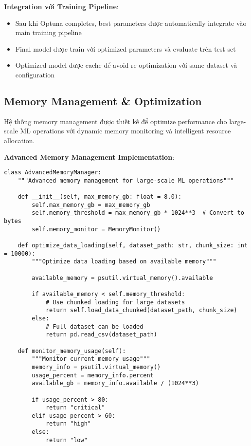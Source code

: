 \textbf{Integration với Training Pipeline}:
\begin{itemize}[leftmargin=*]
    \item Sau khi Optuna completes, best parameters được automatically integrate vào main training pipeline
    \item Final model được train với optimized parameters và evaluate trên test set
    \item Optimized model được cache để avoid re-optimization với same dataset và configuration
\end{itemize}

\subsection{Memory Management \& Optimization}\label{subsec:memory-management}

\noindent
Hệ thống memory management được thiết kế để optimize performance cho large-scale ML operations với dynamic memory monitoring và intelligent resource allocation.

\textbf{Advanced Memory Management Implementation}:

\begin{verbatim}
class AdvancedMemoryManager:
    """Advanced memory management for large-scale ML operations"""
    
    def __init__(self, max_memory_gb: float = 8.0):
        self.max_memory_gb = max_memory_gb
        self.memory_threshold = max_memory_gb * 1024**3  # Convert to bytes
        self.memory_monitor = MemoryMonitor()
        
    def optimize_data_loading(self, dataset_path: str, chunk_size: int = 10000):
        """Optimize data loading based on available memory"""
        
        available_memory = psutil.virtual_memory().available
        
        if available_memory < self.memory_threshold:
            # Use chunked loading for large datasets
            return self.load_data_chunked(dataset_path, chunk_size)
        else:
            # Full dataset can be loaded
            return pd.read_csv(dataset_path)
            
    def monitor_memory_usage(self):
        """Monitor current memory usage"""
        memory_info = psutil.virtual_memory()
        usage_percent = memory_info.percent
        available_gb = memory_info.available / (1024**3)
        
        if usage_percent > 80:
            return "critical"
        elif usage_percent > 60:
            return "high"
        else:
            return "low"
\end{verbatim}

